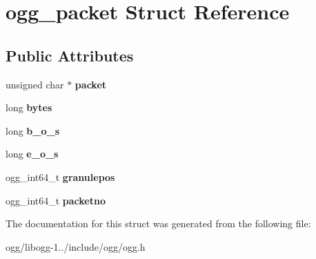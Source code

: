 \hypertarget{structogg__packet}{\section{ogg\+\_\+packet Struct Reference}
\label{structogg__packet}
}
\subsection*{Public Attributes}
\begin{DoxyCompactItemize}
\item 
\hypertarget{structogg__packet_a6b48f432c79884fa25af799318d1f39c}{unsigned char $\ast$ {\bfseries packet}}\label{structogg__packet_a6b48f432c79884fa25af799318d1f39c}

\item 
\hypertarget{structogg__packet_a4438269ce6025d8817865ae66d5881f1}{long {\bfseries bytes}}\label{structogg__packet_a4438269ce6025d8817865ae66d5881f1}

\item 
\hypertarget{structogg__packet_adbf12677237d6f5333017de9b59b4ea7}{long {\bfseries b\+\_\+o\+\_\+s}}\label{structogg__packet_adbf12677237d6f5333017de9b59b4ea7}

\item 
\hypertarget{structogg__packet_aa367e7c5425c5f65cbd126b82dfc72e8}{long {\bfseries e\+\_\+o\+\_\+s}}\label{structogg__packet_aa367e7c5425c5f65cbd126b82dfc72e8}

\item 
\hypertarget{structogg__packet_a838d9a000e08bae982409bc2734fc566}{ogg\+\_\+int64\+\_\+t {\bfseries granulepos}}\label{structogg__packet_a838d9a000e08bae982409bc2734fc566}

\item 
\hypertarget{structogg__packet_a60e257b3a8f843135474457197c65a45}{ogg\+\_\+int64\+\_\+t {\bfseries packetno}}\label{structogg__packet_a60e257b3a8f843135474457197c65a45}

\end{DoxyCompactItemize}


The documentation for this struct was generated from the following file\+:\begin{DoxyCompactItemize}
\item 
ogg/libogg-\/1../include/ogg/ogg.\+h\end{DoxyCompactItemize}
